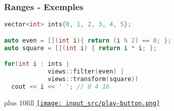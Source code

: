 \documentclass[C++.tex]{subfiles}
\begin{document}
\begin{frame}[fragile]
	\frametitle{Ranges - Exemples}
	\begin{lstlisting}[language=C++]
vector<int> ints{0, 1, 2, 3, 4, 5};

auto even = [](int i){ return (i % 2) == 0; };
auto square = [](int i) { return i * i; };

for(int i : ints | 
            views::filter(even) | 
            views::transform(square))
  cout << i << ' '; // 0 4 16\end{lstlisting}

	\vskip 10mm plus 10fill
	\hfill
	\href{https://godbolt.org/#g:!((g:!((g:!((h:codeEditor,i:(filename:'1',fontScale:14,fontUsePx:'0',j:1,lang:c%2B%2B,selection:(endColumn:1,endLineNumber:24,positionColumn:1,positionLineNumber:24,selectionStartColumn:1,selectionStartLineNumber:1,startColumn:1,startLineNumber:1),source:'%23include+%3Cranges%3E%0A%23include+%3Calgorithm%3E%0A%23include+%3Cvector%3E%0A%23include+%3Ciostream%3E%0A%0Aint+main()%0A%7B%0A++for(int+i+:+std::views::iota(1,+10))%0A++%7B%0A++++std::cout+%3C%3C+i+%3C%3C+!'+!'%3B%0A++%7D%0A++std::cout+%3C%3C+%22%5Cn%22%3B%0A%0A++std::vector%3Cint%3E+foo%7B0,+1,+2,+3,+4,+5%7D%3B%0A++auto+even+%3D+%5B%5D(int+i)%7B+return+(i+%25+2)+%3D%3D+0%3B+%7D%3B%0A++auto+square+%3D+%5B%5D(int+i)+%7B+return+i+*+i%3B+%7D%3B%0A%0A++for(int+i+:+foo+%7C+std::views::filter(even)+%7C++std::views::transform(square))%0A++%7B%0A++++std::cout+%3C%3C+i+%3C%3C+!'+!'%3B%0A++%7D%0A++std::cout+%3C%3C+%22%5Cn%22%3B%0A%7D%0A'),l:'5',n:'0',o:'C%2B%2B+source+%231',t:'0')),k:50,l:'4',n:'0',o:'',s:0,t:'0'),(g:!((h:executor,i:(argsPanelShown:'1',compilationPanelShown:'0',compiler:g122,compilerName:'',compilerOutShown:'0',execArgs:'',execStdin:'',fontScale:14,fontUsePx:'0',j:1,lang:c%2B%2B,libs:!((name:boost,ver:'175')),options:'-std%3Dc%2B%2B20+-Wall+-Wextra+-pedantic',source:1,stdinPanelShown:'1',tree:'1',wrap:'0'),l:'5',n:'0',o:'Executor+x86-64+gcc+12.2+(C%2B%2B,+Editor+%231)',t:'0')),header:(),k:50,l:'4',n:'0',o:'',s:0,t:'0')),l:'2',n:'0',o:'',t:'0')),version:4}{\texttt{[image: input\_src/play-button.png]}}
\end{frame}
\end{document}
